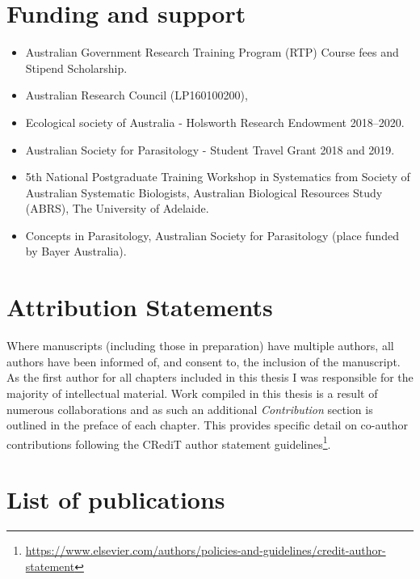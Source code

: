 \documentclass[a4paper, nobind]{templates/ociamthesis}
\providecommand{\tightlist}{%
  \setlength{\itemsep}{0pt}\setlength{\parskip}{0pt}}
\begin{document}
\hypertarget{funding-and-support}{%
\section*{Funding and support}\label{funding-and-support}}

\begin{itemize}
\tightlist
\item
  Australian Government Research Training Program (RTP) Course fees and Stipend Scholarship.
\item
  Australian Research Council (LP160100200),
\item
  Ecological society of Australia - Holsworth Research Endowment 2018--2020.
\item
  Australian Society for Parasitology - Student Travel Grant 2018 and 2019.
\item
  5th National Postgraduate Training Workshop in Systematics from Society of Australian Systematic Biologists, Australian Biological Resources Study (ABRS), The University of Adelaide.
\item
  Concepts in Parasitology, Australian Society for Parasitology (place funded by Bayer Australia).
\end{itemize}

\hypertarget{attribution-statements}{%
\section*{Attribution Statements}\label{attribution-statements}}

Where manuscripts (including those in preparation) have multiple authors, all authors have been informed of, and consent to, the inclusion of the manuscript.
As the first author for all chapters included in this thesis I was responsible for the majority of intellectual material.
Work compiled in this thesis is a result of numerous collaborations and as such an additional \emph{Contribution} section is outlined in the preface of each chapter. This provides specific detail on co-author contributions following the CRediT author statement guidelines\footnote{\url{https://www.elsevier.com/authors/policies-and-guidelines/credit-author-statement}}.

\hypertarget{list-of-publications}{%
\section*{List of publications}\label{list-of-publications}}
\end{document}
